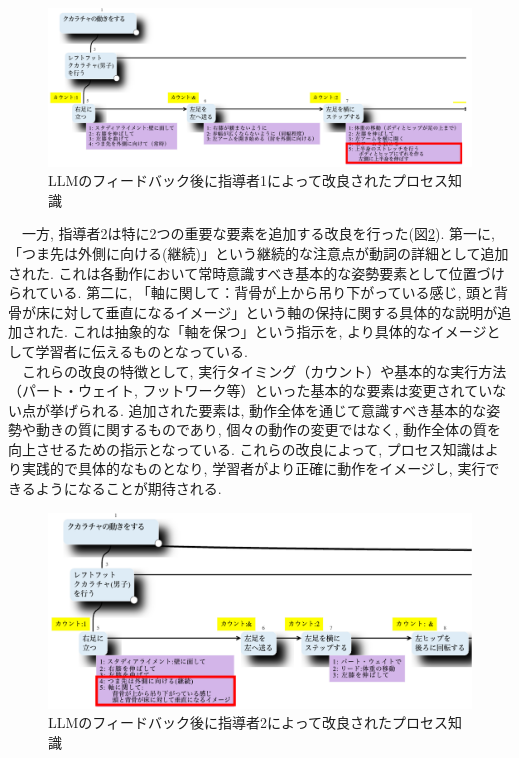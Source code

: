 \begin{figure}[htbp]
    \centering
    \includegraphics[width=1.0\linewidth]{./image/process_knowledge_instructor1_ver2.png}
    \caption{LLMのフィードバック後に指導者1によって改良されたプロセス知識}
    \label{fig:process_knowledge_instructor1_ver2}
\end{figure}

　一方, 指導者2は特に2つの重要な要素を追加する改良を行った(図\ref{fig:process_knowledge_instructor2_ver1}). 第一に, 「つま先は外側に向ける(継続)」という継続的な注意点が動詞の詳細として追加された. これは各動作において常時意識すべき基本的な姿勢要素として位置づけられている. 第二に, 「軸に関して：背骨が上から吊り下がっている感じ, 頭と背骨が床に対して垂直になるイメージ」という軸の保持に関する具体的な説明が追加された. これは抽象的な「軸を保つ」という指示を, より具体的なイメージとして学習者に伝えるものとなっている. \\
　これらの改良の特徴として, 実行タイミング（カウント）や基本的な実行方法（パート・ウェイト, フットワーク等）といった基本的な要素は変更されていない点が挙げられる. 追加された要素は, 動作全体を通じて意識すべき基本的な姿勢や動きの質に関するものであり, 個々の動作の変更ではなく, 動作全体の質を向上させるための指示となっている. これらの改良によって, プロセス知識はより実践的で具体的なものとなり, 学習者がより正確に動作をイメージし, 実行できるようになることが期待される. \\

\begin{figure}[htbp]
    \centering
    \includegraphics[width=1.0\linewidth]{./image/process_knowledge_instructor2_ver1.png}
    \caption{LLMのフィードバック後に指導者2によって改良されたプロセス知識}
    \label{fig:process_knowledge_instructor2_ver1}
\end{figure}

